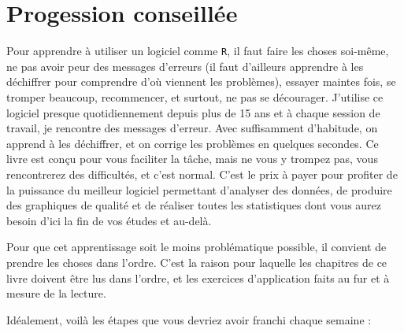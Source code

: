 \documentclass[
  letterpaper,
  DIV=11,
  numbers=noendperiod]{scrreprt}
\begin{document}
\hypertarget{progession-conseilluxe9e}{%
\section*{Progession conseillée}\label{progession-conseilluxe9e}}

Pour apprendre à utiliser un logiciel comme \texttt{R}, il faut faire
les choses soi-même, ne pas avoir peur des messages d'erreurs (il faut
d'ailleurs apprendre à les déchiffrer pour comprendre d'où viennent les
problèmes), essayer maintes fois, se tromper beaucoup, recommencer, et
surtout, ne pas se décourager. J'utilise ce logiciel presque
quotidiennement depuis plus de 15 ans et à chaque session de travail, je
rencontre des messages d'erreur. Avec suffisamment d'habitude, on
apprend à les déchiffrer, et on corrige les problèmes en quelques
secondes. Ce livre est conçu pour vous faciliter la tâche, mais ne vous
y trompez pas, vous rencontrerez des difficultés, et c'est normal. C'est
le prix à payer pour profiter de la puissance du meilleur logiciel
permettant d'analyser des données, de produire des graphiques de qualité
et de réaliser toutes les statistiques dont vous aurez besoin d'ici la
fin de vos études et au-delà.

Pour que cet apprentissage soit le moins problématique possible, il
convient de prendre les choses dans l'ordre. C'est la raison pour
laquelle les chapitres de ce livre doivent être lus dans l'ordre, et les
exercices d'application faits au fur et à mesure de la lecture.

Idéalement, voilà les étapes que vous devriez avoir franchi chaque
semaine :
\end{document}
